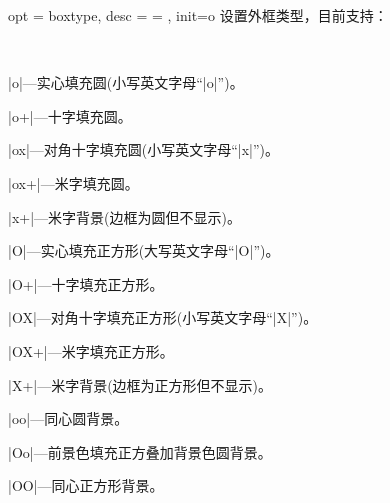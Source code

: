 \documentclass[full]{l3doc}
\begin{document}
\begin{documentation}
\bigskip

\begin{option}{ opt = boxtype, desc = {= }, init=o }
  设置外框类型，目前支持：
\end{option}\\
  \begin{Description}
    \item |o|---实心填充圆(小写英文字母``|o|'')。
    \item |o+|---十字填充圆。
    \item |ox|---对角十字填充圆(小写英文字母``|x|'')。
    \item |ox+|---米字填充圆。
    \item |x+|---米字背景(边框为圆但不显示)。
    \item |O|---实心填充正方形(大写英文字母``|O|'')。
    \item |O+|---十字填充正方形。
    \item |OX|---对角十字填充正方形(小写英文字母``|X|'')。
    \item |OX+|---米字填充正方形。
    \item |X+|---米字背景(边框为正方形但不显示)。
    \item |oo|---同心圆背景。
    \item |Oo|---前景色填充正方叠加背景色圆背景。
    \item |OO|---同心正方形背景。
  \end{Description}
\begin{SideBySideExample}[frame=single,numbers=left,xrightmargin=.50\linewidth,gobble=2]
  \centering
  \quad
  \quad
  \quad
  \quad
\end{SideBySideExample}

\begin{SideBySideExample}[frame=single,numbers=left,xrightmargin=.50\linewidth,gobble=2]
  \centering
  \quad
  \quad
  \quad
  \quad
\end{SideBySideExample}

\begin{SideBySideExample}[frame=single,numbers=left,xrightmargin=.50\linewidth,gobble=2]
  \centering
  \quad
  \quad
  \quad
  \quad
  \quad
\end{SideBySideExample}


\end{documentation}
\end{document}
